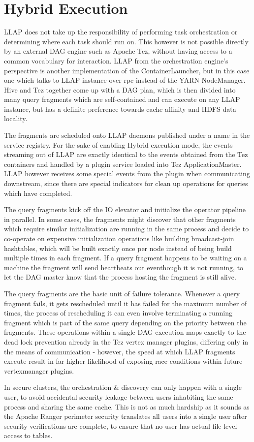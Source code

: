 \section{Hybrid Execution}

LLAP does not take up the responsibility of performing task orchestration or determining where each task should run on. 
This however is not possible directly by an external DAG engine such as Apache Tez\cite{tez}, without having access to
a common vocabulary for interaction. LLAP from the orchestration engine's perspective is another implementation of the
ContainerLauncher, but in this case one which talks to LLAP instance over rpc instead of the YARN NodeManager. Hive and
Tez together come up with a DAG plan, which is then divided into many query fragments which are self-contained and can 
execute on any LLAP instance, but has a definite preference towards cache affinity and HDFS data locality.

The fragments are scheduled onto LLAP daemons published under a name in the service registry. For the sake of enabling 
Hybrid execution mode, the events streaming out of LLAP are exactly identical to the events obtained from the Tez containers
and handled by a plugin service loaded into Tez ApplicationMaster. LLAP however receives some special events from the
plugin when communicating downstream, since there are special indicators for clean up operations for queries which have
completed.

The query fragments kick off the IO elevator and initialize the operator pipeline in parallel. In some cases, the fragments
might discover that other fragments which require similar initialization are running in the same process and decide to 
co-operate on expensive initialization operations like building broadcast-join hashtables, which will be built exactly once
per node instead of being build multiple times in each fragment. If a query fragment happens to be waiting on a machine the
fragment will send heartbeats out eventhough it is not running, to let the DAG master know that the process hosting the
fragment is still alive.

The query fragments are the basic unit of failure tolerance. Whenever a query fragment fails, it gets rescheduled until it
has failed for the maximum number of times, the process of rescheduling it can even involve terminating a running fragment
which is part of the same query depending on the priority between the fragments. These operations within a single DAG execution
maps exactly to the dead lock prevention already in the Tez vertex manager plugins, differing only in the means of communication -
however, the speed at which LLAP fragments execute result in far higher likelihood of exposing race conditions within future 
vertexmanager plugins.


In secure clusters, the orchestration \& discovery can only happen with a single user, to avoid accidental security leakage
between users inhabiting the same process and sharing the same cache. This is not as much hardship as it sounds as the 
Apache Ranger\cite{ranger} perimeter security translates all users into a single user after security verifications are 
complete, to ensure that no user has actual file level access to tables.

